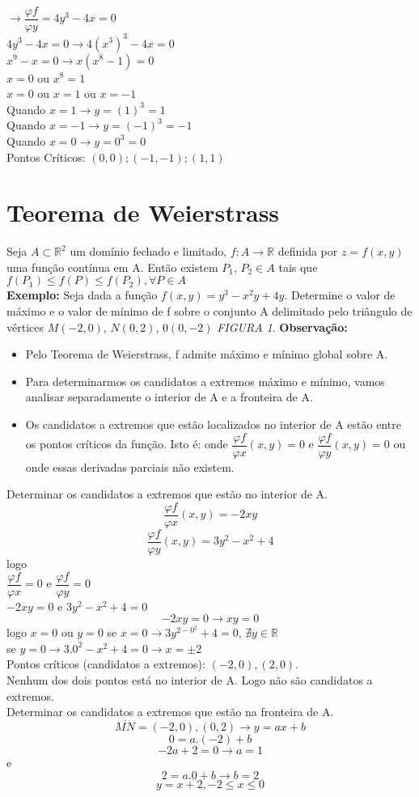 \documentclass{article}
\begin{document}
		$\to \dfrac{\varphi f}{\varphi y} = 4y^3 -4x=0$\\
		$4y^3-4x = 0 \to 4(x^3)^3-4x =0$\\
		$x^9-x=0 \to x(x^8-1)=0$\\
		$x=0$ ou $x^8=1$\\
		$x=0$ ou $x = 1$ ou $x = -1$\\
		Quando $x =1 \to y = (1)^3=1$\\
		Quando $x = -1 \to y = (-1)^3=-1$\\
		Quando $x=0 \to y = 0^3 = 0$ \\
		Pontos Críticos: $(0,0);(-1,-1);(1,1)$
	\section{Teorema de Weierstrass} 
		Seja $A \subset \mathbb{R}^2$ um domínio fechado e limitado, $f:A \to \mathbb{R}$ definida por $z=f(x,y)$ uma função contínua em A. Então existem $P_1$, $P_2 \in A$ tais que $f(P_1) \leq f(P) \leq f(P_2), \forall P \in A$\\
		\textbf{Exemplo:} Seja dada a função $f(x,y)=y^3-x^2y+4y$. Determine o valor de máximo e o valor de mínimo de f sobre o conjunto A delimitado pelo triângulo de vértices $M(-2,0)$, $N(0,2)$, $0(0,-2)$  \textit{FIGURA 1}.
		\textbf{Observação:}
		\begin{itemize}
			\item Pelo Teorema de Weierstrass, f admite máximo e mínimo global sobre A.
			\item Para determinarmos os candidatos a extremos máximo e mínimo, vamos analisar separadamente o interior de A e a fronteira de A.
			\item Os candidatos a extremos que estão localizados no interior de A estão entre os pontos críticos da função. Isto é: onde $\dfrac{\varphi f}{\varphi x}(x,y)=0$ e $\dfrac{\varphi f}{\varphi y}(x,y)=0$ ou onde essas derivadas parciais não existem.
		\end{itemize}
		Determinar os candidatos a extremos que estão no interior de A.
		$$\dfrac{\varphi f}{\varphi x}(x,y)=-2xy$$
		$$\dfrac{\varphi f}{\varphi y}(x,y)= 3y^2-x^2+4$$
		logo\\
		$\dfrac{\varphi f}{\varphi x}=0$ e $\dfrac{\varphi f}{\varphi y}= 0$\\
		$-2xy=0$ e $3y^2 -x^2+4=0$\\
		$$-2xy=0 \to xy=0 $$
		logo $ x=0$ ou $y=0$
		se $x=0 \to 3y^{2-0^2}+4=0$, $\nexists y \in \mathbb{R}$\\
		se $y=0 \to 3.0^2-x^2+4=0\to x= \pm 2$\\%
		Pontos críticos (candidatos a extremos): $(-2,0),(2,0)$.\\
		Nenhum dos dois pontos está no interior de A. Logo não são candidatos a extremos.\\
		Determinar os candidatos a extremos que estão na fronteira de A.
		$$\overline{MN} = (-2,0),(0,2) \to y = ax+b$$
		$$0 = a.(-2) +b$$
		$$-2a+2=0\to a = 1$$
		e
		$$2=a.0+b \to b=2$$
		$$y=x+2, -2\leq x \leq 0$$
		
\end{document}
